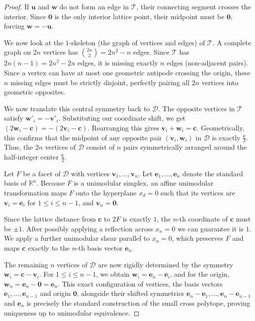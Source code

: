 \documentclass[a4paper,11pt,reqno]{amsart}
\begin{document}
\begin{proof}
If $\bm{u}$ and $\bm{w}$ do not form an edge in $\mathcal{T}$, their connecting segment crosses the interior. 
Since $\bm{0}$ is the only interior lattice point, their midpoint must be $\bm{0}$, forcing $\bm{w} = - \bm{u}$. 
		
We now look at the $1$-skeleton (the graph of vertices and edges) of $\mathcal{T}$. A complete graph on 
$2n$ vertices has $\binom{2n}{2} = 2n^2 - n$ edges. Since $\mathcal{T}$ has $2n(n-1) = 2n^2 - 2n$ edges, 
it is missing exactly $n$ edges (non-adjacent pairs). Since a vertex can have at most one geometric antipode 
crossing the origin, these $n$ missing edges must be strictly disjoint, perfectly pairing all $2n$ vertices into 
geometric opposites.
		
We now translate this central symmetry back to $\mathcal{D}$. The opposite vertices in $\mathcal{T}$ satisfy 
$\bm{w'}_i = - \bm{v'}_i$. Substituting our coordinate shift, we get $(2\bm{w}_i - \bm{c}) = -(2\bm{v}_i - \bm{c})$. 
Rearranging this gives $\bm{v}_i + \bm{w}_i = \bm{c}$. Geometrically, this confirms that the midpoint of any 
opposite pair $(\bm{v}_i, \bm{w}_i)$ in $\mathcal{D}$ is exactly $\frac{\bm{c}}{2}$. Thus, the $2n$ vertices of 
$\mathcal{D}$ consist of $n$ pairs symmetrically arranged around the half-integer center $\frac{\bm{c}}{2}$.
		
Let $F$ be a facet of $\mathcal{D}$ with vertices $\bm{v}_1, \dots, \bm{v}_n$. Let $\bm{e}_1, \dots, \bm{e}_n$ 
denote the standard basis of $\mathbb{R}^n$. Because $F$ is a unimodular simplex, an affine unimodular 
transformation maps $F$ onto the hyperplane $x_d = 0$ such that its vertices are 
$\bm{v}_i = \bm{e}_i$ for $1 \le i \le n-1$, and $\bm{v}_n = \bm{0}$. 
		
Since the lattice distance from $\bm{c}$ to $2F$ is exactly $1$, the $n$-th coordinate of $\bm{c}$ must be $\pm 1$. 
After possibly applying a reflection across $x_n=0$ we can guarantee it is $1$. We apply a further unimodular 
shear parallel to $x_n = 0$, which preserves $F$ and maps $\bm{c}$ exactly to the $n$-th basis vector $\bm{e}_n$. 
		
The remaining $n$ vertices of $\mathcal{D}$ are now rigidly determined by the symmetry $\bm{w}_i = \bm{c} - \bm{v}_i$. 
For $1 \le i \le n-1$, we obtain $\bm{w}_i = \bm{e}_n - \bm{e}_i$, and for the origin, $\bm{w}_n = \bm{e}_n - \bm{0} = \bm{e}_n$. 
This exact configuration of vertices, the basis vectors $\bm{e}_1, \dots, \bm{e}_{n-1}$ and origin $\bm{0}$, alongside 
their shifted symmetrics $\bm{e}_n - \bm{e}_1, \dots, \bm{e}_n - \bm{e}_{n-1}$ and $\bm{e}_n$ is precisely the standard 
construction of the small cross polytope, proving uniqueness up to unimodular equivalence.
\end{proof}
\end{document}
